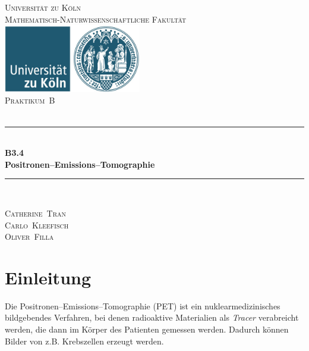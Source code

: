 \documentclass[12pt,a4paper]{scrartcl}
\numberwithin{equation}{section} %
\newcommand{\HRule}{\rule{\linewidth}{0.7mm}}
\renewcommand{\[}{} %
\renewcommand{\]}{\noindent} %
\begin{document}
\begin{titlepage}
	\pagestyle{empty}

	\begin{center}

	\textsc{\LARGE Universität zu Köln }\\ [0.4cm]
	\textsc{Mathematisch-Naturwissenschaftliche Fakultät} \\[1.5cm]

	\includegraphics[width=0.45\textwidth]{../media/uni.jpg}\\[1.5cm]  %

	\textsc{\Large Praktikum~B}\\[2mm]
	\textsc{}\\[10mm]
	\HRule \\[0.4cm]

		{	\Huge \bfseries B3.4}\\[0.4cm]
			{	\huge \bfseries Positronen--Emissions--Tomographie}\\[0.3cm]
	
	\HRule \\[3cm]

 	\begin{center}
		\textsc{\Large Catherine~Tran } \\[3pt]
		\textsc{\Large Carlo~Kleefisch } \\[3pt]
		\textsc{\Large Oliver~Filla } \\[3pt]
	\end{center}
	\end{center}
\end{titlepage}

\newpage
\tableofcontents
\newpage

\hypertarget{einleitung}{%
\section{Einleitung}\label{einleitung}}

Die Positronen--Emissions--Tomographie (PET) ist ein
nuklearmedizinisches bildgebendes Verfahren, bei denen radioaktive
Materialien als \emph{Tracer} verabreicht werden, die dann im Körper des
Patienten gemessen werden. Dadurch können Bilder von z.B. Krebszellen
erzeugt werden.
\end{document}

